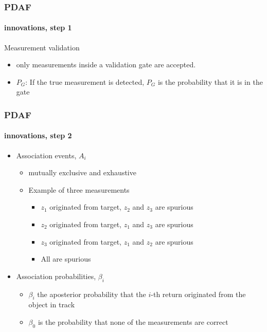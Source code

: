 \begin{frame}
\frametitle{PDAF}
\framesubtitle{innovations, step 1}
\logoCSIPCPL\mypagenum
	{\color{red}Measurement validation}
	\begin{itemize} 
		\item only measurements inside a validation gate are accepted. 
		\item $P_G$: If the true measurement is detected,  $P_G$ is the probability that it is in the gate
	\end{itemize}
\end{frame}





\begin{frame}
\frametitle{PDAF}
\framesubtitle{innovations, step 2}
\logoCSIPCPL\mypagenum
	\begin{itemize}
		\item {\color{red} Association events, $A_i$}
		\begin{itemize}
			\item mutually exclusive and exhaustive
			\item Example of three measurements
			\begin{itemize}
				\item $z_1$ originated from target, $z_2$ and $z_3$ are spurious
				\item $z_2$ originated from target, $z_1$ and $z_3$ are spurious
				\item $z_3$ originated from target, $z_1$ and $z_2$ are spurious
				\item All are spurious
			\end{itemize}
		\end{itemize}
		\item {\color{red} Association probabilities, $\beta_i$}
		\begin{itemize}
			\item $\beta_i$ the aposterior probability that the $i$-th return originated from the object in track
			\item$\beta_0$ is the probability that none of the measurements are correct
		\end{itemize}
	\end{itemize}
\end{frame}




